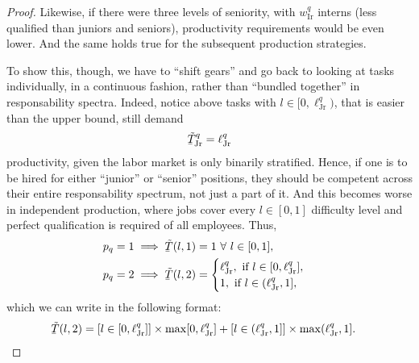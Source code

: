 \documentclass[hidelinks, nonatbib]{elsarticle}
\begin{document}
\begin{lemma}
\begin{proof}
        Likewise, if there were three levels of seniority, with $w_{\text{Ir}}^{q}$ interns (less qualified than juniors and seniors), productivity requirements would be even lower. And the same holds true for the subsequent production strategies.
        
        To show this, though, we have to ``shift gears'' and go back to looking at tasks individually, in a continuous fashion, rather than ``bundled together'' in responsability spectra. Indeed, notice above tasks with $l \in [0, \ell_{\text{Jr}}^{q})$, that is easier than the upper bound, still demand
        \begin{gather}
            \underaccent{\bar}{\tilde{T}}_{\text{Jr}}^{q}
            =
            \ell_{\text{Jr}}^{q}
        \end{gather}
        productivity, given the labor market is only binarily stratified. Hence, if one is to be hired for either ``junior'' or ``senior'' positions, they should be competent across their entire responsability spectrum, not just a part of it. And this becomes worse in independent production, where jobs cover every $l \in [0,1]$ difficulty level and perfect qualification is required of all employees. Thus, 
        \begin{align}
            p_q = 1
            &\implies
            \underaccent{\bar}{\tilde{T}}(l, 1)
            = 1
            \
            \forall
            \
            l \in [0,1]
            ,
            \\
            p_q = 2
            &\implies
            \underaccent{\bar}{\tilde{T}}(l, 2)
            = 
            \begin{cases}
                \ell_{\text{Jr}}^{q}, \text{ if } l \in [0, \ell_{\text{Jr}}^{q}],
                \\
                1, \text{ if } l \in (\ell_{\text{Jr}}^{q}, 1],
            \end{cases}
        \end{align}
        which we can write in the following format:
        \begin{align}
            \underaccent{\bar}{\tilde{T}}(l, 2)
            &= 
            [l \in [0, \ell_{\text{Jr}}^{q}]]
            \times
            \max[0, \ell_{\text{Jr}}^{q}]
            +
            [l \in (\ell_{\text{Jr}}^{q}, 1]]
            \times
            \max(\ell_{\text{Jr}}^{q}, 1]
            .
        \end{align}


\end{proof}
\end{lemma}
\end{document}
